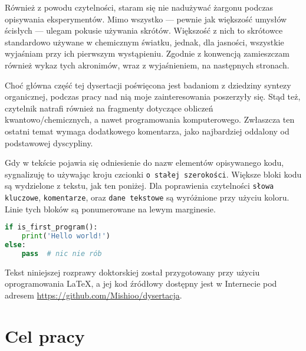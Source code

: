 Również z powodu czytelności, staram się nie nadużywać żargonu podczas opisywania eksperymentów.
Mimo wszystko --- pewnie jak większość umysłów ścisłych --- ulegam pokusie używania skrótów.
Większość z nich to skrótowce standardowo używane w chemicznym światku,
jednak, dla jasności, wszystkie wyjaśniam przy ich pierwszym wystąpieniu.
Zgodnie z konwencją zamieszczam również wykaz tych akronimów, wraz z wyjaśnieniem, na następnych stronach.

Choć główna część tej dysertacji poświęcona jest badaniom z dziedziny syntezy organicznej,
podczas pracy nad nią moje zainteresowania poszerzyły się.
Stąd też, czytelnik natrafi również na fragmenty dotyczące obliczeń kwantowo\-/chemicznych, a nawet programowania komputerowego.
Zwłaszcza ten ostatni temat wymaga dodatkowego komentarza, jako najbardziej oddalony od podstawowej dyscypliny.

Gdy w tekście pojawia się odniesienie do nazw elementów opisywanego kodu,
sygnalizuję to używając kroju czcionki \lstinline!o stałej szerokości!.
Większe bloki kodu są wydzielone z tekstu, jak ten poniżej.
Dla poprawienia czytelności 
\lstinline[basicstyle=\ttfamily\color{wongvermillion},columns=fixed]!słowa kluczowe!, 
\lstinline[basicstyle=\ttfamily\color{wongsky},columns=fixed]!komentarze!, oraz 
\lstinline[basicstyle=\ttfamily\color{wonggreen},columns=fixed]!dane tekstowe!
są wyróżnione przy użyciu koloru.
Linie tych bloków są ponumerowane na lewym marginesie.

\begin{lstlisting}[language=Python]
if is_first_program():
    print('Hello world!')
else:
    pass  # nic nie rób
\end{lstlisting}

Tekst niniejszej rozprawy doktorskiej został przygotowany przy użyciu oprogramowania \LaTeX,
a jej kod źródłowy dostępny jest w Internecie pod adresem \url{https://github.com/Mishioo/dysertacja}.

\begin{fullwidth}
\printglossary[title=Wykaz skrótów, type=\acronymtype]
\end{fullwidth}

\section{Cel pracy}

